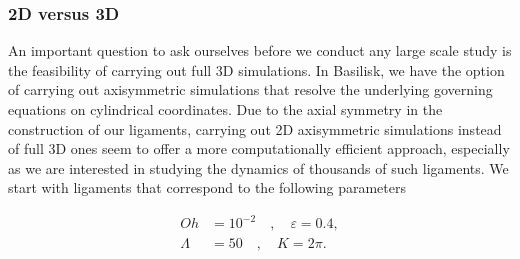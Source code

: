 \subsubsection*{2D versus 3D}

An important question to ask ourselves before we conduct any large scale
study is the feasibility of carrying out full 3D simulations. 
In Basilisk, we have the option of carrying out axisymmetric simulations
that resolve the underlying governing equations on cylindrical coordinates. 
Due to the axial symmetry in the construction of our ligaments, carrying 
out 2D axisymmetric simulations instead of full 3D ones seem to offer a more 
computationally efficient approach, especially as we are interested in studying
the dynamics of thousands of such ligaments. 
We start with ligaments that correspond to the following parameters

\begin{align}
	Oh &= 10^{-2} \quad, \quad \varepsilon = 0.4 , \\
	\Lambda &= 50 \quad , \quad K = 2\pi .
\label{base_params}
\end{align}

